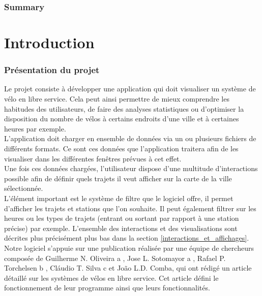 \documentclass[12pt]{article}
\begin{document}
\section*{Summary}


\newpage
\tableofcontents

\newpage
\listoffigures
	
\newpage
\part{Introduction}
	
	\section{Présentation du projet} \label{introduction}
	Le projet consiste à développer une application qui doit visualiser
	un système de vélo en libre service. Cela peut ainsi permettre de mieux comprendre les habitudes
	des utilisateurs, de faire des analyses statistiques ou d'optimiser la disposition du nombre de
	vélos à certains endroits d'une ville et à certaines heures par exemple.\\

	L’application doit charger en ensemble de données via un ou plusieurs fichiers de différents formats. Ce sont ces données que l'application traitera afin de les visualiser dans les différentes fenêtres prévues à cet effet.\\
	
	Une fois ces données chargées, l'utilisateur dispose d'une multitude d'interactions
	possible afin de définir quels trajets il veut afficher sur la carte de la ville sélectionnée.\\		
	L'élément important est le système de filtre que le logiciel offre, il permet d'afficher
	les trajets et stations que l’on souhaite. Il peut également filtrer sur les heures ou
	les types de trajets (entrant ou sortant par rapport à une station précise) par exemple. L'ensemble des interactions et des visualisations sont décrites plus précisément plus bas
	dans la section	\ref{interactions_et_affichages}. \\

	Notre logiciel s'appuie sur une publication réalisée par une équipe de chercheurs composée
	de Guilherme N. Oliveira a , Jose L. Sotomayor a , Rafael P. Torchelsen b , Cláudio T. Silva c
	et 
	João L.D. Comba, qui ont rédigé un article \cite{Oli16} détaillé sur les systèmes de vélos en
	libre service. Cet article défini le fonctionnement de leur programme ainsi que leurs
	fonctionnalités. \\
	
\end{document}

